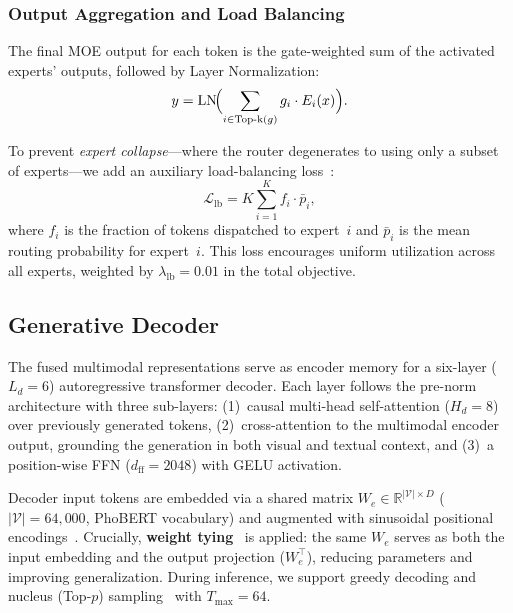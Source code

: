 \subsubsection{Output Aggregation and Load Balancing}
The final MOE output for each token is the gate-weighted sum of the activated experts' outputs, followed by Layer Normalization:
\begin{equation}
    y = \mathrm{LN}\!\Bigl(\sum_{i \in \mathrm{Top\text{-}k}(g)} g_i \cdot E_i(x)\Bigr).
    \label{eq:moe_output}
\end{equation}

To prevent \textit{expert collapse}---where the router degenerates to using only a subset of experts---we add an auxiliary load-balancing loss~\cite{shazeer2017outrageously, fedus2022switch}:
\begin{equation}
    \mathcal{L}_{\mathrm{lb}} = K \sum_{i=1}^{K} f_i \cdot \bar{p}_i,
    \label{eq:load_balance}
\end{equation}
where $f_i$ is the fraction of tokens dispatched to expert~$i$ and $\bar{p}_i$ is the mean routing probability for expert~$i$. This loss encourages uniform utilization across all experts, weighted by $\lambda_{\mathrm{lb}} = 0.01$ in the total objective.

\subsection{Generative Decoder}
\label{sec:method:decoder}

The fused multimodal representations serve as encoder memory for a six-layer ($L_d{=}6$) autoregressive transformer decoder. Each layer follows the pre-norm architecture with three sub-layers: (1)~causal multi-head self-attention ($H_d{=}8$) over previously generated tokens, (2)~cross-attention to the multimodal encoder output, grounding the generation in both visual and textual context, and (3)~a position-wise FFN ($d_{\mathrm{ff}}{=}2048$) with GELU activation.

Decoder input tokens are embedded via a shared matrix $W_e \in \mathbb{R}^{|\mathcal{V}| \times D}$ ($|\mathcal{V}|{=}64{,}000$, PhoBERT vocabulary) and augmented with sinusoidal positional encodings~\cite{vaswani2017attention}. Crucially, \textbf{weight tying}~\cite{press2017using} is applied: the same $W_e$ serves as both the input embedding and the output projection ($W_e^\top$), reducing parameters and improving generalization. During inference, we support greedy decoding and nucleus (Top-$p$) sampling~\cite{holtzman2020curious} with $T_{\max}{=}64$.

